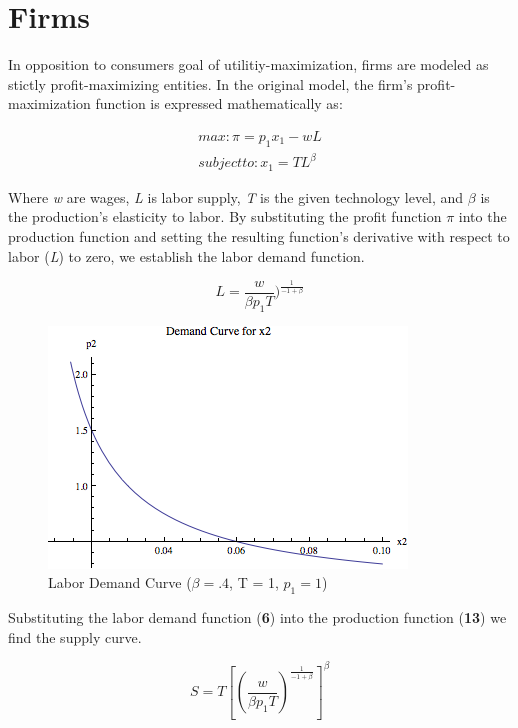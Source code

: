 \documentclass{article}
\begin{document}
\section{Firms}
In opposition to consumers goal of utilitiy-maximization, firms are modeled as stictly profit-maximizing entities. In the original model, the firm's profit-maximization function is expressed mathematically as:


\begin{align}
	max: \pi = p_{1}x_{1} - wL \\ 
	subject to: x_{1} = TL^{\beta}
\end{align}


Where \emph{w} are wages, \emph{L} is labor supply, \emph{T} is the given technology level, and $\beta$ is the production's elasticity to labor. By substituting the profit function $\pi$ into the production function and setting the resulting function's derivative with respect to labor (\emph{L}) to zero, we establish the labor demand function. 

\begin{equation}
	L = \frac{w}{\beta p_{1} T})^{\frac{1}{-1+\beta}}
\end{equation}

\begin{figure}[!ht]
	\begin{center}
	\includegraphics[scale=.75]{Figures/LaborDemand}
	\caption{Labor Demand Curve ($\beta = .4$, T = 1, $p_{1}= 1$)}
	\end{center}
\end{figure}

Substituting the labor demand function ({\bf 6}) into the production function ({\bf 13}) we find the supply curve. 

\begin{equation}
	S = T[(\frac{w}{\beta p_{1} T})^{\frac{1}{-1+\beta}}]^{\beta}
\end{equation}
\end{document}
